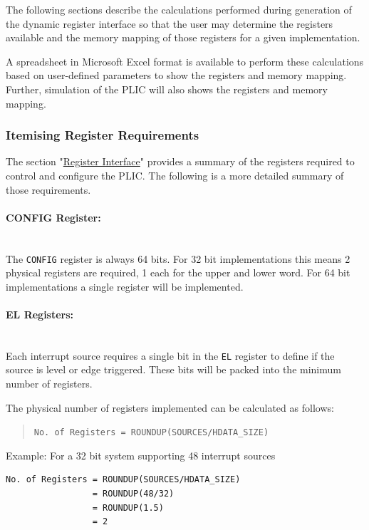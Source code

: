 The following sections describe the calculations performed during
generation of the dynamic register interface so that the user may
determine the registers available and the memory mapping of those
registers for a given implementation.

A spreadsheet in Microsoft Excel format is available to perform these
calculations based on user-defined parameters to show the registers and
memory mapping. Further, simulation of the PLIC will also shows the
registers and memory mapping.

\subsubsection{Itemising Register Requirements}

The section "\protect\hyperlink{register-interface}{Register Interface}"
provides a summary of the registers required to control and configure
the PLIC. The following is a more detailed summary of those
requirements.

\paragraph{CONFIG Register:} ~\\

The \texttt{CONFIG} register is always 64 bits. For 32 bit
implementations this means 2 physical registers are required, 1 each for
the upper and lower word. For 64 bit implementations a single register
will be implemented.

\paragraph{EL Registers:} ~\\

Each interrupt source requires a single bit in the \texttt{EL} register
to define if the source is level or edge triggered. These bits will be
packed into the minimum number of registers.

The physical number of registers implemented can be calculated as
follows:

\begin{quote}
\texttt{No.\ of\ Registers\ =\ ROUNDUP(SOURCES/HDATA\_SIZE)}
\end{quote}

Example: For a 32 bit system supporting 48 interrupt sources

\begin{verbatim}
No. of Registers = ROUNDUP(SOURCES/HDATA_SIZE)   
                 = ROUNDUP(48/32)
                 = ROUNDUP(1.5)
                 = 2
\end{verbatim}

